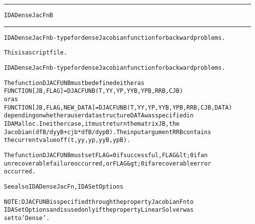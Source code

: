 \begin{samepage}
\hrule
\begin{center}
{\large \verb!IDADenseJacFnB!}
\label{p:IDADenseJacFnB}
\end{center}
\hrule\vspace{0.1in}



\begin{alltt}
IDADenseJacFnb - type for dense Jacobian function for backward problems.
\end{alltt}

\end{samepage}



\begin{samepage}


\begin{alltt}
This is a script file. 
\end{alltt}

\end{samepage}



\begin{alltt}
IDADenseJacFnb - type for dense Jacobian function for backward problems.

   The function DJACFUNB must be defined either as
        FUNCTION [JB, FLAG] = DJACFUNB(T, YY, YP, YYB, YPB, RRB, CJB)
   or as
        FUNCTION [JB,FLAG,NEW_DATA] = DJACFUNB(T,YY,YP,YYB,YPB,RRB,CJB,DATA)
   depending on whether a user data structure DATA was specified in
   IDAMalloc. In either case, it must return the matrix JB, the
   Jacobian (dfB/dyyB + cjb*dfB/dypB). The input argument RRB contains 
   the current value of f(t,yy,yp,yyB,ypB).

   The function DJACFUNB must set FLAG=0 if successful, FLAG&lt;0 if an
   unrecoverable failure occurred, or FLAG&gt;0 if a recoverable error
   occurred.

   See also IDADenseJacFn, IDASetOptions

   NOTE: DJACFUNB is specified through the property JacobianFn to
   IDASetOptions and is used only if the property LinearSolver was
   set to 'Dense'.
\end{alltt}






\vspace{0.1in}